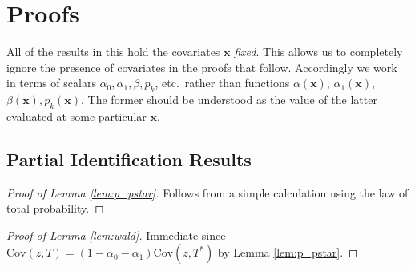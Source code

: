\section{Proofs}
\label{sec:proofs}
All of the results in this hold the covariates $\mathbf{x}$ \emph{fixed}.
This allows us to completely ignore the presence of covariates in the proofs that follow.
Accordingly we work in terms of scalars $\alpha_0, \alpha_1, \beta, p_k$, etc.\ rather than functions $\alpha(\mathbf{x})$, $\alpha_1(\mathbf{x})$, $\beta(\mathbf{x}), p_k(\mathbf{x})$.
The former should be understood as the value of the latter evaluated at some particular $\mathbf{x}$.

\subsection{Partial Identification Results}
\begin{proof}[Proof of Lemma \ref{lem:p_pstar}]
  Follows from a simple calculation using the law of total probability.
\end{proof}

\begin{proof}[Proof of Lemma \ref{lem:wald}]
  Immediate since $\mbox{Cov}(z,T) = (1 - \alpha_0 - \alpha_1) \mbox{Cov}(z,T^*)$ by Lemma \ref{lem:p_pstar}.
\end{proof}

